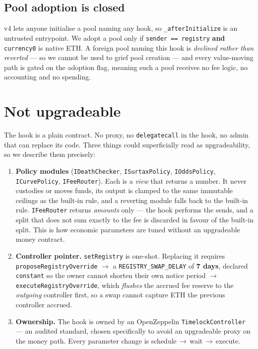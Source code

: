 \documentclass[11pt,a4paper]{article}
\newcommand{\code}[1]{\texttt{\small #1}}
\begin{document}
\subsection{Pool adoption is closed}

v4 lets anyone initialise a pool naming any hook, so \code{\_afterInitialize} is
an untrusted entrypoint. We adopt a pool only if \code{sender == registry}
\textbf{and} \code{currency0} is native ETH. A foreign pool naming this hook is
\emph{declined rather than reverted} --- so we cannot be used to grief pool
creation --- and every value-moving path is gated on the adoption flag, meaning
such a pool receives no fee logic, no accounting and no spending.

\section{Not upgradeable}
\label{sec:upgrade}

The hook is a plain contract. No proxy, no \code{delegatecall} in the hook, no
admin that can replace its code. Three things could superficially read as
upgradeability, so we describe them precisely:

\begin{enumerate}
\item \textbf{Policy modules} (\code{IDeathChecker}, \code{ISurtaxPolicy},
\code{IOddsPolicy}, \code{ICurvePolicy}, \code{IFeeRouter}). Each is a
\emph{view} that returns a number. It never custodies or moves funds, its output
is clamped to the same immutable ceilings as the built-in rule, and a reverting
module falls back to the built-in rule. \code{IFeeRouter} returns \emph{amounts}
only --- the hook performs the sends, and a split that does not sum exactly to
the fee is discarded in favour of the built-in split. This is how economic
parameters are tuned without an upgradeable money contract.
\item \textbf{Controller pointer.} \code{setRegistry} is one-shot. Replacing it
requires \code{proposeRegistryOverride} $\rightarrow$ a \code{REGISTRY\_SWAP\_DELAY}
of \textbf{7 days}, declared \code{constant} so the owner cannot shorten their own
notice period $\rightarrow$ \code{executeRegistryOverride}, which \emph{flushes}
the accrued fee reserve to the \emph{outgoing} controller first, so a swap cannot
capture ETH the previous controller accrued.
\item \textbf{Ownership.} The hook is owned by an OpenZeppelin
\code{TimelockController} --- an audited standard, chosen specifically to avoid
an upgradeable proxy on the money path. Every parameter change is
schedule\,$\rightarrow$\,wait\,$\rightarrow$\,execute.
\end{enumerate}
\end{document}
